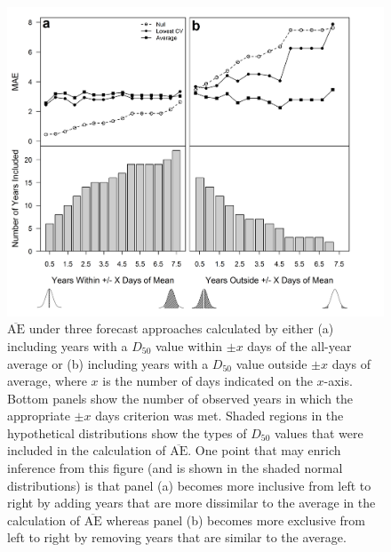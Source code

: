 \documentclass[12pt,]{book}
\theoremstyle{definition}
\theoremstyle{definition}
\theoremstyle{definition}
\theoremstyle{remark}
\begin{document}
\begin{figure}
  \centering
  \includegraphics{img/Ch2/mae-subsets.png}
  \caption{$\overline{\text{AE}}$ under three forecast approaches calculated by either (a) including years with a $D_{50}$ value within $\pm x$  days of the all-year average or (b) including years with a $D_{50}$ value outside $\pm x$ days of average, where $x$ is the number of days indicated on the $x$-axis. Bottom panels show the number of observed years in which the appropriate $\pm x$ days criterion was met. Shaded regions in the hypothetical distributions show the types of $D_{50}$ values that were included in the calculation of $\overline{\text{AE}}$. One point that may enrich inference from this figure (and is shown in the shaded normal distributions) is that panel (a) becomes more inclusive from left to right by adding years that are more dissimilar to the average in the calculation of $\overline{\text{AE}}$ whereas panel (b) becomes more exclusive from left to right by removing years that are similar to the average.}
  \label{fig:mae-subsets}
\end{figure}

\pagebreak
\end{document}
